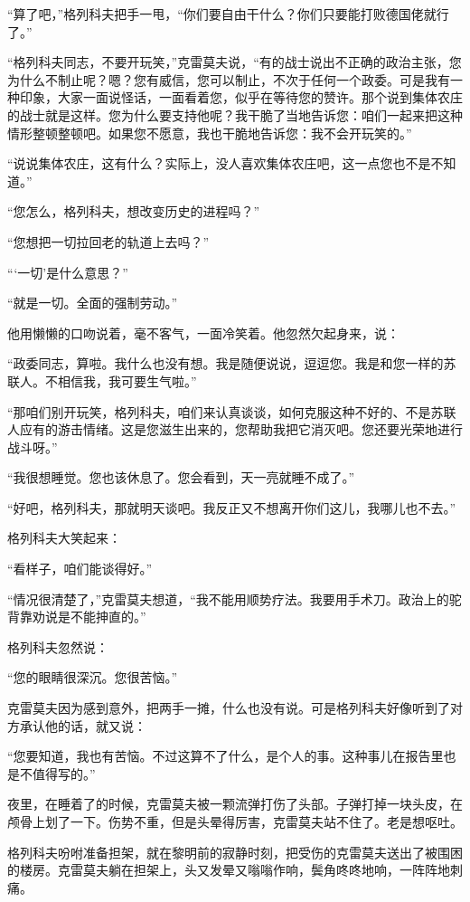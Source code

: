 “算了吧，”格列科夫把手一甩，“你们要自由干什么？你们只要能打败德国佬就行了。”

“格列科夫同志，不要开玩笑，”克雷莫夫说，“有的战士说出不正确的政治主张，您为什么不制止呢？嗯？您有威信，您可以制止，不次于任何一个政委。可是我有一种印象，大家一面说怪话，一面看着您，似乎在等待您的赞许。那个说到集体农庄的战士就是这样。您为什么要支持他呢？我干脆了当地告诉您：咱们一起来把这种情形整顿整顿吧。如果您不愿意，我也干脆地告诉您：我不会开玩笑的。”

“说说集体农庄，这有什么？实际上，没人喜欢集体农庄吧，这一点您也不是不知道。”

“您怎么，格列科夫，想改变历史的进程吗？”

“您想把一切拉回老的轨道上去吗？”

“‘一切’是什么意思？”

“就是一切。全面的强制劳动。”

他用懒懒的口吻说着，毫不客气，一面冷笑着。他忽然欠起身来，说：

“政委同志，算啦。我什么也没有想。我是随便说说，逗逗您。我是和您一样的苏联人。不相信我，我可要生气啦。”

“那咱们别开玩笑，格列科夫，咱们来认真谈谈，如何克服这种不好的、不是苏联人应有的游击情绪。这是您滋生出来的，您帮助我把它消灭吧。您还要光荣地进行战斗呀。”

“我很想睡觉。您也该休息了。您会看到，天一亮就睡不成了。”

“好吧，格列科夫，那就明天谈吧。我反正又不想离开你们这儿，我哪儿也不去。”

格列科夫大笑起来：

“看样子，咱们能谈得好。”

“情况很清楚了，”克雷莫夫想道，“我不能用顺势疗法。我要用手术刀。政治上的驼背靠劝说是不能抻直的。”

格列科夫忽然说：

“您的眼睛很深沉。您很苦恼。”

克雷莫夫因为感到意外，把两手一摊，什么也没有说。可是格列科夫好像听到了对方承认他的话，就又说：

“您要知道，我也有苦恼。不过这算不了什么，是个人的事。这种事儿在报告里也是不值得写的。”

夜里，在睡着了的时候，克雷莫夫被一颗流弹打伤了头部。子弹打掉一块头皮，在颅骨上划了一下。伤势不重，但是头晕得厉害，克雷莫夫站不住了。老是想呕吐。

格列科夫吩咐准备担架，就在黎明前的寂静时刻，把受伤的克雷莫夫送出了被围困的楼房。克雷莫夫躺在担架上，头又发晕又嗡嗡作响，鬓角咚咚地响，一阵阵地刺痛。


